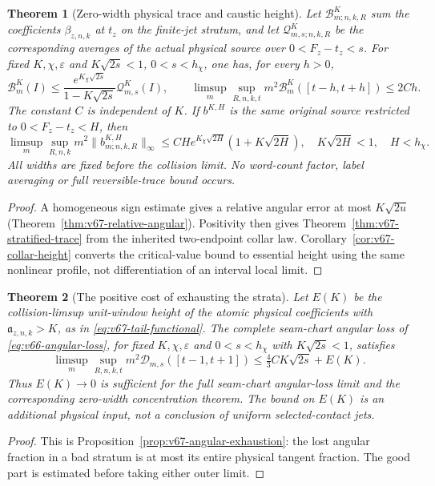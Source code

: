 \documentclass[11pt,reqno]{amsart}
\numberwithin{equation}{section}
\newtheorem{leadtheorem}{Theorem}
\theoremstyle{definition}\newtheorem{definition}[theorem]{Definition}
\theoremstyle{remark}\newtheorem{remark}[theorem]{Remark}
\begin{document}
\begin{leadtheorem}[Zero-width physical trace and caustic height]
\label{thm:intro-v67-trace}
Let $\mathcal B^K_{m;n,k,R}$ sum the coefficients $\beta_{z,n,k}$
at $t_z$ on the finite-jet stratum, and let
$\mathcal Q^K_{m,s;n,k,R}$ be the corresponding averages of the actual
physical source over $0<F_z-t_z<s$. For fixed $K,\chi,\varepsilon$
and $K\sqrt{2s}<1$, $0<s<h_\chi$, one has, for every $h>0$,
\[
 \mathcal B^K_m(I)\le
       \frac{e^{K_\chi\sqrt{2s}}}{1-K\sqrt{2s}}\mathcal Q^K_{m,s}(I),
 \qquad
 \limsup_m\sup_{R,n,k,t}m^2\mathcal B^K_m([t-h,t+h])\le2Ch.
\]
The constant $C$ is independent of $K$. If $b^{K,H}$ is the same
original source restricted to $0<F_z-t_z<H$, then
\[
 \limsup_m\sup_{R,n,k}m^2\|b^{K,H}_{m;n,k,R}\|_\infty
 \le CH e^{K_\chi\sqrt{2H}}(1+K\sqrt{2H}),
 \quad K\sqrt{2H}<1,\quad H<h_\chi.
\]
All widths are fixed before the collision limit. No word-count factor,
label averaging or full reversible-trace bound occurs.
\end{leadtheorem}
\begin{proof}
A homogeneous sign estimate gives a relative angular error at most
$K\sqrt{2u}$ (Theorem~\ref{thm:v67-relative-angular}). Positivity
then gives Theorem~\ref{thm:v67-stratified-trace} from the inherited
two-endpoint collar law. Corollary~\ref{cor:v67-collar-height}
converts the critical-value bound to essential height using the same
nonlinear profile, not differentiation of an interval local limit.
\end{proof}

\begin{leadtheorem}[The positive cost of exhausting the strata]
\label{thm:intro-v67-tail}
Let $E(K)$ be the collision-limsup unit-window height of the atomic
physical coefficients with $\mathfrak a_{z,n,k}>K$, as in
\eqref{eq:v67-tail-functional}. The complete seam-chart angular loss
of \eqref{eq:v66-angular-loss}, for fixed $K,\chi,\varepsilon$ and
$0<s<h_\chi$ with $K\sqrt{2s}<1$, satisfies
\[
 \limsup_m\sup_{R,n,k,t}m^2\mathcal D_{m,s}([t-1,t+1])
                           \le\tfrac43 CK\sqrt{2s}+E(K).
\]
Thus $E(K)\to0$ is sufficient for the full seam-chart angular-loss
limit and the corresponding zero-width concentration theorem.
The bound on $E(K)$ is an additional physical input, not a conclusion
of uniform selected-contact jets.
\end{leadtheorem}
\begin{proof}
This is Proposition~\ref{prop:v67-angular-exhaustion}: the lost angular
fraction in a bad stratum is at most its entire physical tangent
fraction. The good part is estimated before taking either outer limit.
\end{proof}
\end{document}
